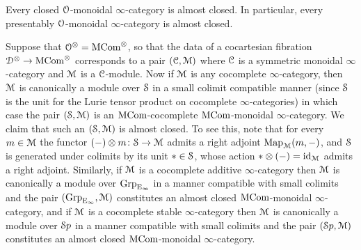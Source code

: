 \begin{remark}
Every closed $\mathcal{O}$-monoidal $\infty$-category is almost closed. In particular, every presentably $\mathcal{O}$-monoidal $\infty$-category is almost closed.
\end{remark}


\begin{example}
\label{example:mcom-almost-presentable}%
Suppose that $\mathcal{O}^{\otimes} = \mathrm{MCom}^{\otimes}$, so that the data of a cocartesian fibration $\mathcal{D}^{\otimes} \to \mathrm{MCom}^{\otimes}$ corresponds to a pair $(\mathcal C,\mathcal{M})$ where $\mathcal C$ is a symmetric monoidal $\infty$-category and $\mathcal{M}$ is a $\mathcal C$-module. Now if $\mathcal{M}$ is any cocomplete $\infty$-category, then $\mathcal{M}$ is canonically a module over $\mathcal S$ in a small colimit compatible manner (since $\mathcal S$ is the unit for the Lurie tensor product on cocomplete $\infty$-categories) in which case the pair $(\mathcal S,\mathcal{M})$ is an $\mathrm{MCom}$-cocomplete $\mathrm{MCom}$-monoidal $\infty$-category. We claim that such an $(\mathcal S,\mathcal{M})$ is almost closed. 
To see this, note that for every $m \in \mathcal{M}$ the functor $(-) \otimes m\colon \mathcal S \to \mathcal{M}$ admits a right adjoint $\operatorname{Map}_{\mathcal{M}}(m,-)$, and $\mathcal S$ is generated under colimits by its unit $\ast \in \mathcal S$, whose action $\ast \otimes (-) = \mathrm{id}_{\mathcal{M}}$ admits a right adjoint. Similarly, if $\mathcal{M}$ is a cocomplete additive $\infty$-category then $\mathcal{M}$ is canonically a module over $\operatorname{Grp}_{{\mathrm{E}_{\infty}}}$ in a manner compatible with small colimits and the pair $(\operatorname{Grp}_{{\mathrm{E}_{\infty}}},\mathcal{M})$ constitutes an almost closed %
$\mathrm{MCom}$-monoidal $\infty$-category,
and if $\mathcal{M}$ is a cocomplete stable $\infty$-category then $\mathcal{M}$ is canonically a module over ${\mathcal Sp}$ in a manner compatible with small colimits and the pair $({\mathcal Sp},\mathcal{M})$ constitutes an almost closed 
$\mathrm{MCom}$-monoidal $\infty$-category.
\end{example}



